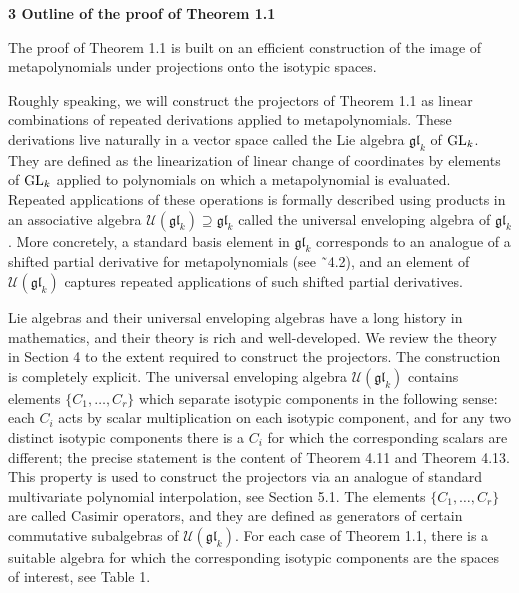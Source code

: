 

\par\medskip\noindent\textbf{3 Outline of the proof of Theorem 1.1}\par




The proof of Theorem 1.1 is built on an efficient construction of the image of metapolynomials under projections onto the isotypic spaces.





Roughly speaking, we will construct the projectors of Theorem 1.1 as linear combinations of repeated derivations applied to metapolynomials. These derivations live naturally in a vector space called the Lie algebra $\mathfrak{gl}_{k}$ of $\textnormal{GL}_{k}$. They are defined as the linearization of linear change of coordinates by elements of $\textnormal{GL}_{k}$ applied to polynomials on which a metapolynomial is evaluated. Repeated applications of these operations is formally described using products in an associative algebra $\mathcal{U}(\mathfrak{gl}_{k})\supseteq\mathfrak{gl}_{k}$ called the universal enveloping algebra of $\mathfrak{gl}_{k}$.
More concretely, a standard basis element in $\mathfrak{gl}_{k}$ corresponds to an analogue of a shifted partial derivative for metapolynomials (see ˜4.2), and an element of $\mathcal{U}(\mathfrak{gl}_{k})$ captures repeated applications of such shifted partial derivatives.





Lie algebras and their universal enveloping algebras have a long history in mathematics, and their theory is rich and well-developed. We review the theory in Section 4 to the extent required to construct the projectors. The construction is completely explicit. The universal enveloping algebra $\mathcal{U}(\mathfrak{gl}_{k})$ contains elements $\{C_{1},\ldots,C_{r}\}$ which separate isotypic components in the following sense: each $C_{i}$ acts by scalar multiplication on each isotypic component, and for any two distinct isotypic components there is a $C_{i}$ for which the corresponding scalars are different; the precise statement is the content of Theorem 4.11 and Theorem 4.13. This property is used to construct the projectors via an analogue of standard multivariate polynomial interpolation, see Section 5.1. The elements $\{C_{1},\ldots,C_{r}\}$ are called Casimir operators, and they are defined as generators of certain commutative subalgebras of $\mathcal{U}(\mathfrak{gl}_{k})$. For each case of Theorem 1.1, there is a suitable algebra for which the corresponding isotypic components are the spaces of interest, see Table 1.





